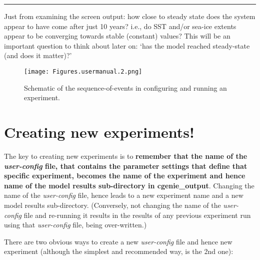 \vspace{1mm}\noindent\rule{4cm}{0.5pt}\vspace{2mm}

\noindent Just from examining the screen output: how close to steady state does the system appear to have come after just 10 years? i.e., do SST and/or sea-ice extents appear to be converging towards stable (constant) values? This will be an important question to think about later on: ‘has the model reached steady-state (and does it matter)?’

\newpage

\begin{figure}
\texttt{[image: Figures.usermanual.2.png]}\centering
\vspace{2mm}
\caption{Schematic of the sequence-of-events in configuring and running an experiment.}
\label{fig:chx-jobcreation}
\end{figure}

\newpage

\section{Creating new experiments!}

The key to creating new experiments is to \textbf{remember that the name of the \textit{user-config} file, that contains the parameter settings that define that specific experiment, becomes the name of the experiment and hence name of the model results sub-directory in \textsf{\footnotesize cgenie\_output}}. Changing the name of the \textit{user-config} file, hence leads to a new experiment name and a new model results sub-directory. (Conversely, not changing the name of the  \textit{user-config} file and re-running it results in the results of any previous experiment run using that \textit{user-config} file, being over-written.)

\newpage

There are two obvious ways to create a new \textit{user-config} file and hence new experiment (although the simplest and recommended way, is the 2nd one):

